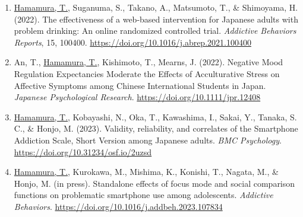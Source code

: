 \documentclass[a4paper]{article}
\begin{document}
\begin{enumerate}
	\item \underline{Hamamura, T.}, Suganuma, S., Takano, A., Matsumoto, T., \& Shimoyama, H. (2022). The effectiveness of a web-based intervention for Japanese adults with problem drinking: An online randomized controlled trial. \textit{Addictive Behaviors Reports}, 15, 100400. \url{https://doi.org/10.1016/j.abrep.2021.100400}
	\item An, T., \underline{Hamamura, T.}, Kishimoto, T., Mearns, J. (2022). Negative Mood Regulation Expectancies Moderate the Effects of Acculturative Stress on Affective Symptoms among Chinese International Students in Japan. \textit{Japanese Psychological Research}. \url{https://doi.org/10.1111/jpr.12408}
	\item \underline{Hamamura, T.}, Kobayashi, N., Oka, T., Kawashima, I., Sakai, Y., Tanaka, S. C., \& Honjo, M. (2023). Validity, reliability, and correlates of the Smartphone Addiction Scale, Short Version among Japanese adults. \textit{BMC Psychology}. \url{https://doi.org/10.31234/osf.io/2uzsd}
	\item \underline{Hamamura, T.}, Kurokawa, M., Mishima, K., Konishi, T., Nagata, M., \& Honjo, M. (in press). Standalone effects of focus mode and social comparison functions on problematic smartphone use among adolescents. \textit{Addictive Behaviors}. \url{https://doi.org/10.1016/j.addbeh.2023.107834}
\end{enumerate}
\end{document}
